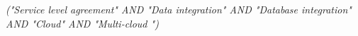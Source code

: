 
\begin{center}
\textit{("Service level agreement"  AND "Data integration" AND "Database integration" AND "Cloud" AND "Multi-cloud ")} \\ 
\end{center}
\medskip



